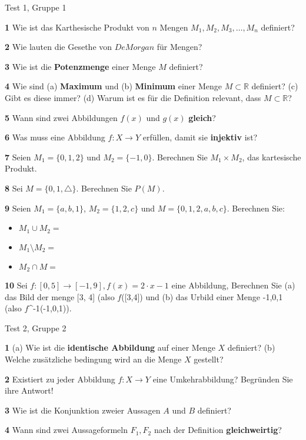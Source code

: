 \documentclass[11pt]{article}
\begin{document}
Test 1, Gruppe 1

    \textbf{1} Wie ist das Karthesische Produkt von $n$ Mengen $M_1, M_2, M_3, \dots, M_n$ definiert?

    \textbf{2} Wie lauten die Gesethe von $De Morgan$ für Mengen?

    \textbf{3} Wie ist die \textbf{Potenzmenge} einer Menge $M$ definiert?

    \textbf{4} Wie sind (a) \textbf{Maximum} und (b) \textbf{Minimum} einer Menge $M \subset \mathbb{R}$ definiert? (c) Gibt es diese immer? (d) Warum ist es für die Definition relevant, dass $M \subset \mathbb{R}$?

    \textbf{5} Wann sind zwei Abbildungen $f(x)$ und $g(x)$ \textbf{gleich}?

    \textbf{6} Was muss eine Abbildung $f : X \rightarrow Y $ erfüllen, damit sie \textbf{injektiv} ist?

    \textbf{7} Seien \( M_1 = \{0,1,2\} \) und \( M_2 = \{-1, 0\} \). Berechnen Sie \( M_1 \times M_2 \), das kartesische Produkt.

    \textbf{8} Sei \( M = \{0, 1, \triangle\} \). Berechnen Sie \( P(M) \).

    \textbf{9} Seien \( M_1 = \{a, b, 1\} \), \( M_2 = \{1, 2, c\} \) und \( M = \{0, 1, 2, a, b, c\} \). Berechnen Sie:
    \begin{itemize}
        \item \( M_1 \cup M_2 =\)
        \item \( M_1 \setminus M_2 =\)
        \item \( M_2 \cap M =\)
    \end{itemize}

\textbf{10} Sei $f : [0,5] \rightarrow [-1,9], f(x) = 2 \cdot x - 1$ eine Abbildung, Berechnen Sie (a) das Bild der menge [3, 4] (also $f$([3,4]) und (b) das Urbild einer Menge {-1,0,1} (also $f$^{-1}({-1,0,1})).

Test 2, Gruppe 2

    \textbf{1} (a) Wie ist die \textbf{identische Abbildung} auf einer Menge $X$ definiert? (b) Welche zusätzliche bedingung wird an die Menge $X$ gestellt?

    \textbf{2} Existiert zu jeder Abbildung $f : X \rightarrow Y $ eine Umkehrabbildung? Begründen Sie ihre Antwort!

    \textbf{3} Wie ist die Konjunktion zweier Aussagen $A$ und $B$ definiert?

    \textbf{4} Wann sind zwei Aussageformeln $F_1, F_2$ nach der Definition \textbf{gleichweirtig}?
\end{document}
